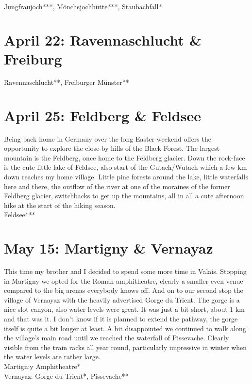Jungfraujoch***, M\"onchsjochh\"utte***, Staubachfall*

\section{April 22: Ravennaschlucht \& Freiburg}
\label{Freiburg2011}

Ravennaschlucht**, Freiburger M\"unster**

\section{April 25: Feldberg \& Feldsee}
\label{Feldsee}

Being back home in Germany over the long Easter weekend offers the opportunity to explore the close-by hills of the Black Forest. The largest mountain is the Feldberg, once home to the Feldberg glacier. Down the rock-face is the cute little lake of Feldsee, also start of the Gutach/Wutach which a few km down reaches my home village. Little pine forests around the lake, little waterfalls here and there, the outflow of the river at one of the moraines of the former Feldberg glacier, switchbacks to get up the mountains, all in all a cute afternoon hike at the start of the hiking season.\\

Feldsee***

\section{May 15: Martigny \& Vernayaz}
\label{Martigny2011}

This time my brother and I decided to spend some more time in Valais. Stopping in Martigny we opted for the Roman amphitheatre, clearly a smaller even venue compared to the big arenas everybody knows off. And on to our second stop the village of Vernayaz with the heavily advertised Gorge du Trient. The gorge is a nice slot canyon, also water levels were great. It was just a bit short, about 1 km and that was it. I don't know if it is planned to extend the pathway, the gorge itself is quite a bit longer at least. A bit disappointed we continued to walk along the village's main road until we reached the waterfall of Pissevache. Clearly visible from the train racks all year round, particularly impressive in winter when the water levels are rather large.\\

Martign:y Amphitheatre*\\
Vernayaz: Gorge du Trient*, Pissevache**\\

